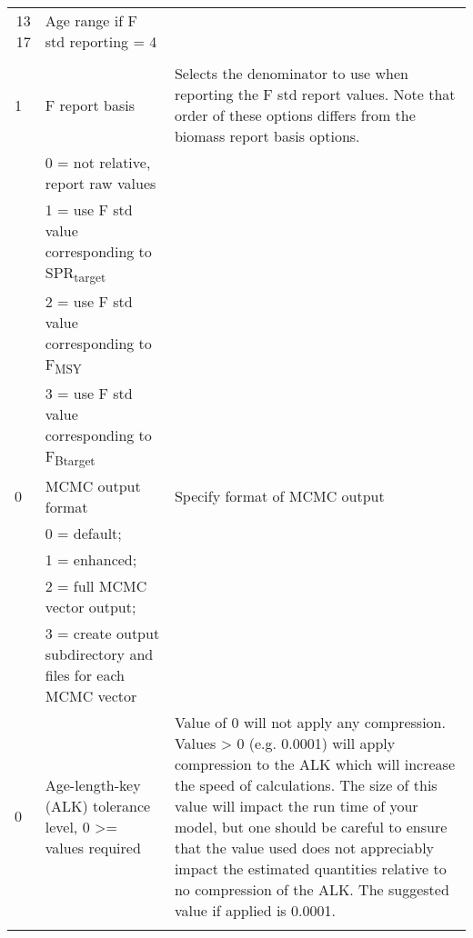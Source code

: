 \begin{landscape}
\begin{longtable}{p{3cm} p{7cm} p{11cm}}
 \multicolumn{1}{r}{13 17}  & Age range if F std reporting = 4 & \\
  \\

 \hline
 1 & F report basis &  \multirow{1}{1cm}[-0.1cm]{\parbox{11cm}{Selects the denominator to use when reporting the F std report values.  Note that order of these options differs from the biomass report basis options.}}\\
   & 0 = not relative, report raw values & \\
   & 1 = use F std value corresponding to SPR\textsubscript{target} & \\
   & 2 = use F std value corresponding to F\textsubscript{MSY} & \\
   & 3 = use F std value corresponding to F\textsubscript{Btarget} & \\

  \hline
  0 & MCMC output format & \multirow{1}{1cm}[-0.1cm]{\parbox{11cm}{Specify format of MCMC output}} \\
  & 0 = default; & \\
  & 1 = enhanced; &  \\
  & 2 = full MCMC vector output; &  \\		 
  & 3 = create output subdirectory and files for each MCMC vector &  \\		 
  
  \hline
  \hypertarget{ALK}{0} & Age-length-key (ALK) tolerance level, 0 >= values required & Value of 0 will not apply any compression.  Values > 0 (e.g. 0.0001) will apply compression to the ALK which will increase the speed of calculations.  The size of this value will impact the run time of your model, but one should be careful to ensure that the value used does not appreciably impact the estimated quantities relative to no compression of the ALK.  The suggested value if applied is 0.0001. \\  
  
\pagebreak
 

\end{longtable}
\end{landscape}
